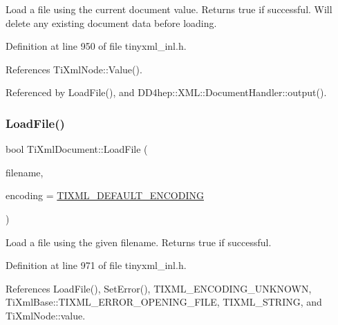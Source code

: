 Load a file using the current document value. Returns true if successful. Will delete any existing document data before loading. 

Definition at line 950 of file tinyxml\+\_\+inl.\+h.



References Ti\+Xml\+Node\+::\+Value().



Referenced by Load\+File(), and D\+D4hep\+::\+X\+M\+L\+::\+Document\+Handler\+::output().

\hypertarget{class_ti_xml_document_a879cdf5e981b8b2d2ef82f2546dd28fb}{}\label{class_ti_xml_document_a879cdf5e981b8b2d2ef82f2546dd28fb} 
\subsubsection{\texorpdfstring{Load\+File()}{LoadFile()}\hspace{0.1cm}{\footnotesize\ttfamily [2/4]}}
{\footnotesize\ttfamily bool Ti\+Xml\+Document\+::\+Load\+File (\begin{DoxyParamCaption}\item[{const char $\ast$}]{filename,  }\item[{\hyperlink{tinyxml_8h_a88d51847a13ee0f4b4d320d03d2c4d96}{Ti\+Xml\+Encoding}}]{encoding = {\ttfamily \hyperlink{tinyxml_8h_ad5b8b092878e9010d6400cb6c13d4879}{T\+I\+X\+M\+L\+\_\+\+D\+E\+F\+A\+U\+L\+T\+\_\+\+E\+N\+C\+O\+D\+I\+NG}} }\end{DoxyParamCaption})}



Load a file using the given filename. Returns true if successful. 



Definition at line 971 of file tinyxml\+\_\+inl.\+h.



References Load\+File(), Set\+Error(), T\+I\+X\+M\+L\+\_\+\+E\+N\+C\+O\+D\+I\+N\+G\+\_\+\+U\+N\+K\+N\+O\+WN, Ti\+Xml\+Base\+::\+T\+I\+X\+M\+L\+\_\+\+E\+R\+R\+O\+R\+\_\+\+O\+P\+E\+N\+I\+N\+G\+\_\+\+F\+I\+LE, T\+I\+X\+M\+L\+\_\+\+S\+T\+R\+I\+NG, and Ti\+Xml\+Node\+::value.

\hypertarget{class_ti_xml_document_a41f6fe7200864d1dca663d230caf8db6}{}\label{class_ti_xml_document_a41f6fe7200864d1dca663d230caf8db6} 
